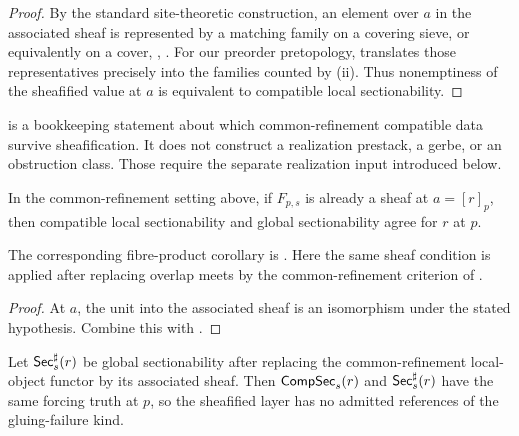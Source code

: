 \begin{proof}
By the standard site-theoretic construction, an element over $a$ in the
associated sheaf is represented by a matching family on a covering sieve, or
equivalently on a cover,
\cite[Chap.~III, \S2]{MacLaneMoerdijk1994},
\cite[Part~B2.2]{Johnstone2002}. For our preorder pretopology,
 translates those representatives
precisely into the families counted by (ii). Thus
nonemptiness of the sheafified value at $a$ is equivalent to compatible local
sectionability.
\end{proof}

\begin{remark}\label{rem:sheafification-bookkeeping}
 is a bookkeeping statement about
which common-refinement compatible data survive sheafification. It does not
construct a realization prestack, a gerbe, or an obstruction class. Those require
the separate realization input introduced below.
\end{remark}

\begin{corollary}\label{cor:sheaf-local-to-global}
In the common-refinement setting above, if $F_{p,s}$ is already a sheaf at
$a=[r]_p$, then compatible local sectionability and global sectionability agree
for $r$ at $p$.
\end{corollary}

\begin{remark}
The corresponding fibre-product corollary is
\cite[Corollary~4.7]{HomologicalVisibilityGluingObstructions2026}. Here the
same sheaf condition is applied after replacing overlap meets by the
common-refinement criterion of .
\end{remark}

\begin{proof}
At $a$, the unit into the associated sheaf is an isomorphism under the stated
hypothesis. Combine this with .
\end{proof}

\begin{corollary}\label{cor:sheafification-removes-glue}
Let $\mathsf{Sec}_s^{\sharp}(r)$ be global sectionability after replacing the
common-refinement local-object functor by its associated sheaf. Then
$\mathsf{CompSec}_s(r)$ and $\mathsf{Sec}_s^{\sharp}(r)$ have the same forcing truth at $p$, so
the sheafified layer has no admitted references of the gluing-failure kind.
\end{corollary}

